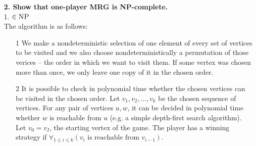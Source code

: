 \noindent
\textbf{2. Show that one-player MRG is NP-complete.}\\
1. \underline{$\in \textsc{NP}$}\\
The algorithm is as follows:\\
\begin{itemize}
      \item[1] We make a nondeterministic selection of one element of every set of vertices to be visited
               and we also choose nondeterministically a permutation of those verices -- the order in which
               we want to visit them. If some vertex was chosen more than once, we only leave one copy of it
               in the chosen order.
      \item[2] It is possible to check in polynomial time whether the chosen vertices can be visited in the
               chosen order. Let $v_1, v_2, ..., v_k$ be the chosen sequence of vertices. For any pair of
               vertices $u, w$, it can be decided in polynomial time whether $w$ is reachable from $u$
               (e.g. a simple depth-first search algorithm). Let $v_0 = v_I$, the starting vertex of the game.
               The player has a winning strategy if $\forall_{1 \leq i \leq k}(v_i \text{ is reachable from } v_{i-1})$.
\end{itemize}

